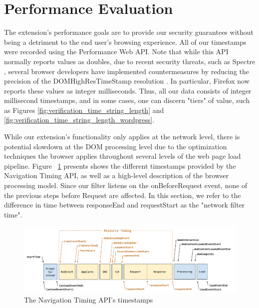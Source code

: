 \section{Performance Evaluation}
The extension's performance goals are to provide our security guarantees without being a detriment to the end user's browsing experience. All of our timestamps were recorded using the Performance Web API. Note that while this API normally reports values as doubles, due to recent security threats, such as Spectre \cite{DBLP:journals/corr/abs-1801-01203}, several browser developers have implemented countermeasures by reducing the precision of the DOMHighResTimeStamp resolution \cite{reducetimeprecision,resolutionconsiderations}. In particular, Firefox now reports these values as integer milliseconds. Thus, all our data consists of integer millisecond timestamps, and in some cases, one can discern "tiers" of value, such as Figures \ref{fig:verification_time_string_length} and \ref{fig:verification_time_string_length_wordpress}.

While our extension's functionality only applies at the network level, there is potential slowdown at the DOM processing level due to the optimization techniques the browser applies throughout several levels of the web page load pipeline. Figure ~\ref{fig:navigationtiming} presents shows the different timestamps provided by the Navigation Timing API, as well as a high-level description of the browser processing model. Since our filter listens on the onBeforeRequest event, none of the previous steps before Request are affected. In this section, we refer to the difference in time between responseEnd and requestStart as the "network filter time".

\begin{figure}[h]
 \includegraphics[scale=0.32]{img/timestamp-diagram}
 \caption{The Navigation Timing API's timestamps}
 \label{fig:navigationtiming}
 \end{figure}

